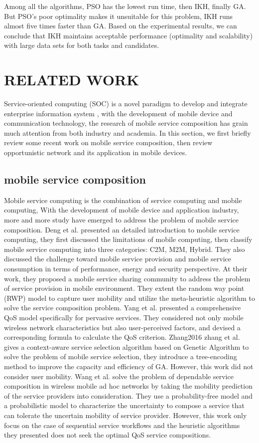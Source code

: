 \documentclass[10pt,journal,compsoc]{IEEEtran}
\begin{document}
Among all the algorithms, PSO has the lowest run time, then IKH, finally GA. But PSO's poor optimality makes it unsuitable for this problem, IKH runs almost five times faster than GA. Based on the experimental results, we can conclude that IKH maintains acceptable performance (optimality and scalability) with large data sets for both tasks and candidates.

\section{RELATED WORK}
Service-oriented computing (SOC) is a novel paradigm to develop and integrate enterprise information system \cite{papazoglou2003service}, with the development of mobile device and communication technology, the research of mobile service composition has grain much attention from both industry and academia. In this section, we first briefly review some recent work on mobile service composition, then review opportunistic network and its application in mobile devices.

\subsection{mobile service composition}
Mobile service computing is the combination of service computing and mobile computing, With the development of mobile device and application industry, more and more study have emerged to address the problem of mobile service composition. 
Deng et al. \cite{Deng2016} presented an detailed introduction to mobile service computing, they first discussed the limitations of mobile computing, then classify mobile service computing into three categories: C2M, M2M, Hybrid. They also discussed the challenge toward mobile service provision and mobile service consumption in terms of performance, energy and security perspective. At their \cite{Deng2017} work, they proposed a mobile service sharing community to address the problem of service provision in mobile environment. They extent the random way point (RWP) model to capture user mobility and utilize the meta-heuristic algorithm to solve the service composition problem. Yang et al. \cite{Yang2010} presented a comprehensive QoS model specifically for pervasive services. They considered not only mobile wireless network characteristics but also user-perceived factors, and devised a corresponding formula to calculate the QoS criterion. 
Zhang2016
zhang et al. \cite{Zhang2016qos} gives a context-aware service selection algorithm based on Genetic Algorithm to solve the problem of mobile service selection, they introduce a tree-encoding method to improve the capacity and efficiency of GA. However, this work did not consider user mobility.
Wang et al. \cite{wang2011exploiting} solve the problem of dependable service composition in wireless mobile ad hoc networks by taking the mobility prediction of the service providers into consideration.
They use a probability-free model and a probabilistic model to characterize the uncertainty to compose a service that can tolerate the uncertain mobility of service provider. However, this work only focus on the case of sequential service workflows and the heuristic algorithms they presented does not seek the optimal QoS service compositions.
\end{document}
